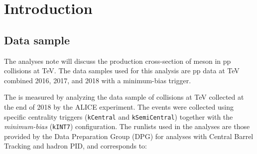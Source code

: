 \section{Introduction}


 
 
\subsection{Data sample}
\label{sec:data_sample}
The analyses note will discuss the production cross-section of \Dstar meson in pp collisions at  TeV. The data samples used for this analysis are pp data at  TeV combined 2016, 2017, and 2018 with a minimum-bias trigger. 


The \raa is measured by analyzing the data sample of \pbpb collisions at  TeV collected at the end of 2018 by the ALICE experiment. The events were collected using specific centrality triggers (\texttt{kCentral} and \texttt{kSemiCentral}) together with the \textit{minimum-bias} (\texttt{kINT7}) configuration.
The runlists used in the analyses are those provided by the Data Preparation Group (DPG) for analyses with Central Barrel Tracking and hadron PID, and corresponds to:



